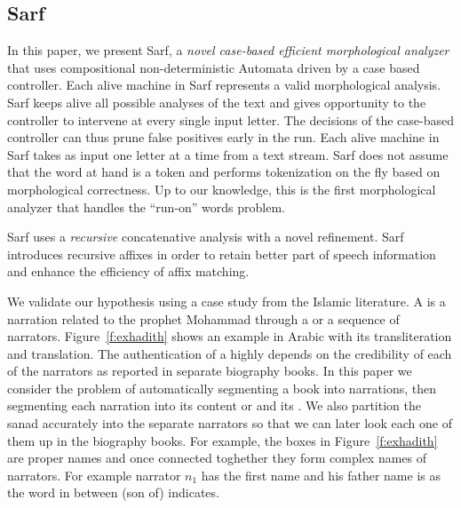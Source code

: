 \documentclass[11pt,letterpaper]{article}
\newcommand{\noArRL}[1]{\arabfalse\RL{#1}\arabtrue}
\newcommand{\noTrRL}[1]{\transfalse\RL{#1}\transtrue}
\begin{document}
\subsection{Sarf}
\label{sec:intro:sarf}

In this paper, we present Sarf, a {\em novel case-based efficient
morphological analyzer} that uses compositional 
non-deterministic Automata driven by a case based controller.
Each alive machine in Sarf represents a valid morphological analysis. 
Sarf keeps alive all possible analyses of the text and gives 
opportunity to the controller to intervene at every single input 
letter. 
The decisions of the case-based controller can thus prune false 
positives early in the run. 
Each alive machine in Sarf takes as input one letter at a time 
from a text stream. 
Sarf does not assume that the word at hand is a token and
performs tokenization on the fly based on morphological correctness.
Up to our knowledge, this is the first morphological analyzer that 
handles the ``run-on'' words problem. 

Sarf uses a {\em recursive} concatenative analysis with a novel 
refinement. 
Sarf introduces recursive affixes in order to
retain better part of speech information and enhance the 
efficiency of affix matching. 


\transfalse
\begin{figure}[tb]
\end{figure}
\transtrue

We validate our hypothesis using a case study from the Islamic 
literature. 
A  is a narration related to the prophet Mohammad
through a  or a sequence of narrators. 
Figure~\ref{f:exhadith} shows an example \noArRL{.hady_t} in Arabic with its 
transliteration and translation. 
The authentication of a \noArRL{.hady_t} highly depends on the credibility
of each of the narrators as reported in separate biography 
books. 
In this paper we consider the problem of automatically segmenting
a \noArRL{.hady_t} book into narrations, then segmenting each narration into
its content or  and its \noArRL{sanad}.
We also partition the sanad accurately into the 
separate narrators so that we can later look each one of them 
up in the biography books. 
For example, the boxes in Figure~\ref{f:exhadith} are proper names and once
connected toghether they form complex names of narrators. For example
narrator $n_1$ has the first name \noTrRL{qtybT} and his father name is
\noTrRL{s`yd} as the word in between \noTrRL{bn} (son of) indicates. 
\end{document}
